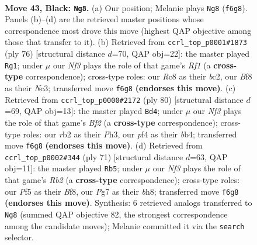 \documentclass[11pt]{article}
\begin{document}
\clearpage

\begin{figure}[p]\centering
\begin{subfigure}{0.46\textwidth}\centering
\resizebox{\linewidth}{!}{%
\newchessgame
\chessboard[
  setfen={2r2b2/p5p1/P1b2nk1/1p3p1p/1P3P2/4P1PK/1R6/RNB5 b - - 1 43},
  showmover=false,
  pgfstyle=straightmove, color=movearrow, markmove={f6-g8}
]}
\caption{}
\end{subfigure}\hfill
\begin{subfigure}{0.46\textwidth}\centering
\resizebox{\linewidth}{!}{%
\newchessgame
\chessboard[
  setfen={6k1/5p2/4pBp1/4P3/pr2p2P/2Nn2K1/P1b2PP1/5R2 w - - 13 39},
  showmover=false,
  pgfstyle=straightmove, color=movearrow, markmove={f1-g1}
]}
\caption{}
\end{subfigure}
\\[4pt]
\begin{subfigure}{0.46\textwidth}\centering
\resizebox{\linewidth}{!}{%
\newchessgame
\chessboard[
  setfen={2R5/p3r1k1/1p3ppp/1B2n3/Pb4P1/1P4PP/5BK1/8 w - - 3 41},
  showmover=false,
  pgfstyle=straightmove, color=movearrow, markmove={f2-d4}
]}
\caption{}
\end{subfigure}\hfill
\begin{subfigure}{0.46\textwidth}\centering
\resizebox{\linewidth}{!}{%
\newchessgame
\chessboard[
  setfen={5b1B/1r1p1k1p/2n3p1/p7/4b3/1p2N2P/1P3PP1/R3R1K1 b - - 3 36},
  showmover=false,
  pgfstyle=straightmove, color=movearrow, markmove={b7-b5}
]}
\caption{}
\end{subfigure}
\caption{\textbf{Move 43, Black: \texttt{Ng8}.} (a) Our position; Melanie plays \texttt{Ng8} (\texttt{f6g8}). Panels (b)--(d) are the retrieved master positions whose correspondence most drove this move (highest QAP objective among those that transfer to it). (b) Retrieved from \texttt{ccrl\_top\_p0001\#1873} (ply 76) [structural distance $d$=70, QAP obj=22]: the master played \texttt{Rg1}; under $\mu$ our \emph{Nf3} plays the role of that game's \emph{Rf1} (a \textbf{cross-type} correspondence); cross-type roles: our \emph{R}c8 as their \emph{b}c2, our \emph{B}f8 as their \emph{N}c3; transferred move \texttt{f6g8} \textbf{(endorses this move)}. (c) Retrieved from \texttt{ccrl\_top\_p0000\#2172} (ply 80) [structural distance $d$=69, QAP obj=13]: the master played \texttt{Bd4}; under $\mu$ our \emph{Nf3} plays the role of that game's \emph{Bf2} (a \textbf{cross-type} correspondence); cross-type roles: our \emph{r}b2 as their \emph{P}h3, our \emph{p}f4 as their \emph{b}b4; transferred move \texttt{f6g8} \textbf{(endorses this move)}. (d) Retrieved from \texttt{ccrl\_top\_p0002\#344} (ply 71) [structural distance $d$=63, QAP obj=11]: the master played \texttt{Rb5}; under $\mu$ our \emph{Nf3} plays the role of that game's \emph{Rb2} (a \textbf{cross-type} correspondence); cross-type roles: our \emph{P}f5 as their \emph{B}f8, our \emph{P}g7 as their \emph{b}h8; transferred move \texttt{f6g8} \textbf{(endorses this move)}. Synthesis: 6 retrieved analogs transferred to \texttt{Ng8} (summed QAP objective 82, the strongest correspondence among the candidate moves); Melanie committed it via the \texttt{search} selector.}
\label{fig:thought-m85}
\end{figure}
\end{document}
